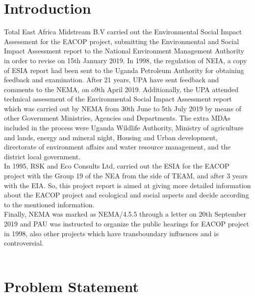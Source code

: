 \documentclass[12pt]{article}
\begin{document}
\section*{Introduction}

{\fontsize{12pt}{12pt}\selectfont 

\hspace*{1em}Total East Africa Midstream B.V carried out the Environmental Social Impact Assessment for the EACOP project, submitting the Environmental and Social Impact Assessment report to the National Environment Management Authority in order to revise on 15th January 2019. In 1998, the regulation of NEIA, a copy of ESIA report had been sent to the Uganda Petroleum Authority for obtaining feedback and examination. After 21 years, UPA have sent feedback and comments to the NEMA, on o9th April 2019. Additionally, the UPA attended technical assessment of the Environmental Social Impact Assessment report which was carried out by NEMA from 30th June to 5th July 2019 by means of other Government Ministries, Agencies and Departments. The extra MDAs included in the process were Uganda Wildlife Authority, Ministry of agriculture and lands, energy and mineral night, Housing and Urban development, directorate of environment affairs and water resource management, and the district local government.
\\

In 1995, RSK and Eco Consults Ltd, carried out the ESIA for the EACOP project with the Group 19 of the NEA from the side of TEAM, and after 3 years with the EIA. So, this project report is aimed at giving more detailed information about the EACOP project and ecological and social aspects and decide according to the mentioned information. 
\\

Finally, NEMA was marked as NEMA/4.5.5 through a letter on 20th September 2019 and PAU was instructed to organize the public hearings for EACOP project in 1998, also other projects which have transboundary influences and is controversial.  
\\
\\

}


\section*{Problem Statement}
\end{document}
